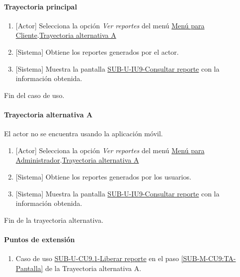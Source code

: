 \paragraph{Trayectoria principal}
	\begin{enumerate}
		\item {[Actor]} Selecciona la opción \textit{Ver reportes} del menú \hyperref[fig:menu-cliente]{Menú para Cliente}.\hyperref[SUB-U-CU9:TA]{Trayectoria alternativa A}
		\item {[Sistema]} Obtiene los reportes generados por el actor.
		\item {[Sistema]} Muestra la pantalla \hyperref[fig:sub-u-iu9]{SUB-U-IU9-Consultar reporte} con la información obtenida.
	\end{enumerate}
	Fin del caso de uso.

\paragraph{Trayectoria alternativa A} \label{SUB-U-CU9:TA}
	El actor no se encuentra usando la aplicación móvil.
	\begin{enumerate}[label=A\arabic*.]
		\item {[Actor]} Selecciona la opción \textit{Ver reportes} del menú \hyperref[fig:menu-cliente]{Menú para Administrador}.\hyperref[SUB-U-CU9:TA]{Trayectoria alternativa A}
		\item {[Sistema]} Obtiene los reportes generados por los usuarios.
		\item \label{SUB-M-CU9:TA-Pantalla} {[Sistema]} Muestra la pantalla \hyperref[fig:sub-u-iu9]{SUB-U-IU9-Consultar reporte} con la información obtenida.
	\end{enumerate}
	Fin de la trayectoria alternativa.

\paragraph{Puntos de extensión} \label{SUB-U-CU9:PE}
\begin{enumerate}[label=PE\arabic*.]
	\item Caso de uso \hyperref[SUB-U-CU9.1]{SUB-U-CU9.1-Liberar reporte} en el paso \ref{SUB-M-CU9:TA-Pantalla} de la Trayectoria alternativa A.
\end{enumerate}
